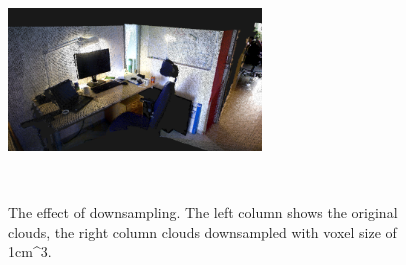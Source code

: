 \documentclass[11pt,a4paper]{kth-mag}
\begin{document}
\begin{figure}
{{      \includegraphics[width=0.60\textwidth]{images/nils_side_ds}
    }\\
  }
  \centerline{
    \\
  }
  \caption{The effect of downsampling. The left column shows the original
    clouds, the right column clouds downsampled with voxel size of 1cm^3.}
  \label{fig:downsample_effect}
\end{figure}
\end{document}
